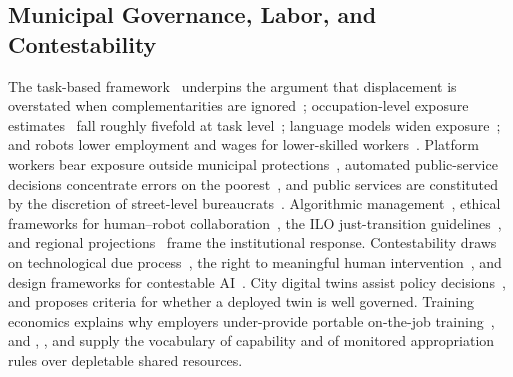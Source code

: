 \documentclass[utf8]{frontiers_suppmat}
\begin{document}
\subsection{Municipal Governance, Labor, and Contestability}
\label{app:rw-labor}

The task-based framework~\citep{AutorLevyMurnane2003} underpins the argument that displacement is overstated when complementarities are ignored~\citep{Autor2015}; occupation-level exposure estimates~\citep{FreyOsborne2017} fall roughly fivefold at task level~\citep{Arntz2016}; language models widen exposure~\citep{Eloundou2024}; and robots lower employment and wages for lower-skilled workers~\citep{AcemogluRestrepo2020}. Platform workers bear exposure outside municipal protections~\citep{Wood2019,DeStefano2016}, automated public-service decisions concentrate errors on the poorest~\citep{Eubanks2018}, and public services are constituted by the discretion of street-level bureaucrats~\citep{Lipsky2010}. Algorithmic management~\citep{OECDAM2025,OECD2026Policy}, ethical frameworks for human--robot collaboration~\citep{Callari2024}, the ILO just-transition guidelines~\citep{ILO2015}, and regional projections~\citep{ILOESCWA2026,WEF2025} frame the institutional response. Contestability draws on technological due process~\citep{Citron2008,CitronPasquale2014}, the right to meaningful human intervention~\citep{Almada2019,Vaccaro2019}, and design frameworks for contestable AI~\citep{Alfrink2023}. City digital twins assist policy decisions~\citep{Temple2024}, and \citet{DiazSarachaga2025} proposes criteria for whether a deployed twin is well governed. Training economics explains why employers under-provide portable on-the-job training~\citep{AcemogluPischke1998,WolterRyan2011}, and \citet{Sen1999}, \citet{Nussbaum2011}, and \citet{Ostrom1990} supply the vocabulary of capability and of monitored appropriation rules over depletable shared resources.



\end{document}
